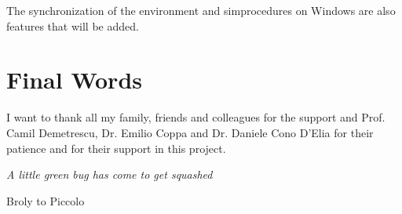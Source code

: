The synchronization of the environment and simprocedures on Windows are also features that will be added.

\section{Final Words}

I want to thank all my family, friends and colleagues for the support and Prof. Camil Demetrescu, Dr. Emilio Coppa and Dr. Daniele Cono D'Elia for their patience and for their support in this project.

\vfill

{\em A little green bug has come to get squashed}

Broly to Piccolo


